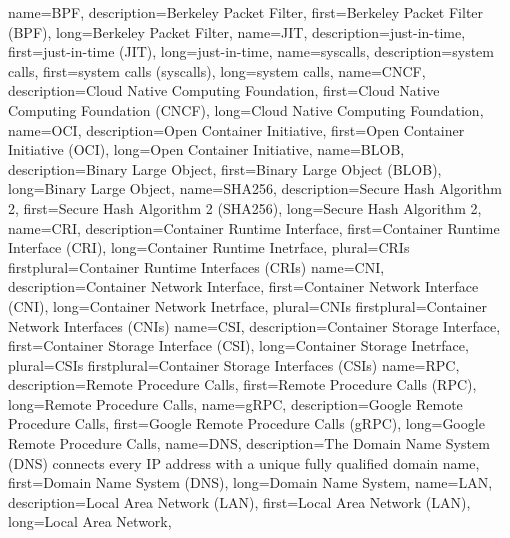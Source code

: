 {%
    name={BPF},
    description={Berkeley Packet Filter},
    first={Berkeley Packet Filter (BPF)},
    long={Berkeley Packet Filter},
}
{%
    name={JIT},
    description={just-in-time},
    first={just-in-time (JIT)},
    long={just-in-time},
}
{%
    name={syscalls},
    description={system calls},
    first={system calls (syscalls)},
    long={system calls},
}
{%
    name={CNCF},
    description={Cloud Native Computing Foundation},
    first={Cloud Native Computing Foundation (CNCF)},
    long={Cloud Native Computing Foundation},
}
{%
    name={OCI},
    description={Open Container Initiative},
    first={Open Container Initiative (OCI)},
    long={Open Container Initiative},
}
{%
    name={BLOB},
    description={Binary Large Object},
    first={Binary Large Object (BLOB)},
    long={Binary Large Object},
}
{%
    name={SHA256},
    description={Secure Hash Algorithm 2},
    first={Secure Hash Algorithm 2 (SHA256)},
    long={Secure Hash Algorithm 2},
}
{%
    name={CRI},
    description={Container Runtime Interface},
    first={Container Runtime Interface (CRI)},
    long={Container Runtime Inetrface},
    plural={CRIs}
    firstplural={Container Runtime Interfaces (CRIs)}
}
{%
    name={CNI},
    description={Container Network Interface},
    first={Container Network Interface (CNI)},
    long={Container Network Inetrface},
    plural={CNIs}
    firstplural={Container Network Interfaces (CNIs)}
}
{%
    name={CSI},
    description={Container Storage Interface},
    first={Container Storage Interface (CSI)},
    long={Container Storage Inetrface},
    plural={CSIs}
    firstplural={Container Storage Interfaces (CSIs)}
}
{%
    name={RPC},
    description={Remote Procedure Calls},
    first={Remote Procedure Calls (RPC)},
    long={Remote Procedure Calls},
}
{%
    name={gRPC},
    description={Google Remote Procedure Calls},
    first={Google Remote Procedure Calls (gRPC)},
    long={Google Remote Procedure Calls},
}
{%
    name={DNS},
    description={The Domain Name System (DNS) connects every IP address with a unique fully qualified domain name},
    first={Domain Name System (DNS)},
    long={Domain Name System},
}
{%
    name={LAN},
    description={Local Area Network (LAN)},
    first={Local Area Network (LAN)},
    long={Local Area Network},
}
